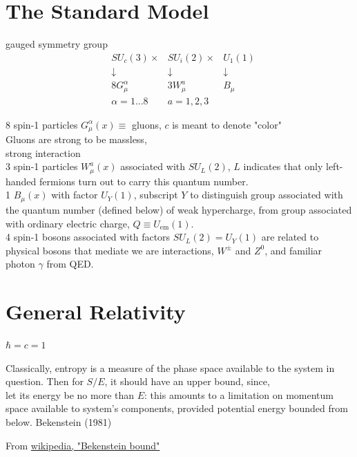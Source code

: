 \documentclass[10pt]{amsart}
\begin{document}
\begin{multicols*}{2}
\part{The Standard Model}

gauged symmetry group 
\[
\begin{aligned}
& SU_c(3) \times & SU_i(2) \times & U_1(1) \\	
& \downarrow & \downarrow & \downarrow \\
& 8G^{\alpha}_{\mu} & 3 W_{\mu}^a & B_{\mu} \\
& \alpha = 1 \dots 8 & a = 1, 2, 3 & 
\end{aligned}
\]

8 spin-1 particles $G^{\alpha}_{\mu}(x) \equiv $ gluons, $c$ is meant to denote "color" \\
Gluons are strong to be massless, \\
strong interaction \\

3 spin-1 particles $W^a_{\mu}(x)$ associated with $SU_L(2)$, $L$ indicates that only left-handed fermions turn out to carry this quantum number. \\

1 $B_{\mu}(x)$ with factor $U_Y(1)$, subscript $Y$ to distinguish group associated with the quantum number (defined below) of weak hypercharge, from group associated with ordinary electric charge, $Q \equiv U_{\text{em}}(1)$. \\

4 spin-1 bosons associated with factors $SU_L(2) = U_Y(1)$ are related to physical bosons that mediate we are interactions, $W^{\pm}$ and $Z^0$, and familiar photon $\gamma$ from QED.

\part{General Relativity}

$\hbar = c = 1$

Classically, entropy is a measure of the phase space available to the system in question. Then for $S/E$, it should have an upper bound, since, \\
let its energy be no more than $E$: this amounts to a limitation on momentum space available to system's components, provided potential energy bounded from below. Bekenstein (1981) \cite{Beke1981}

From \href{https://en.wikipedia.org/wiki/Bekenstein_bound}{wikipedia, "Bekenstein bound"}


\end{multicols*}
\end{document}
